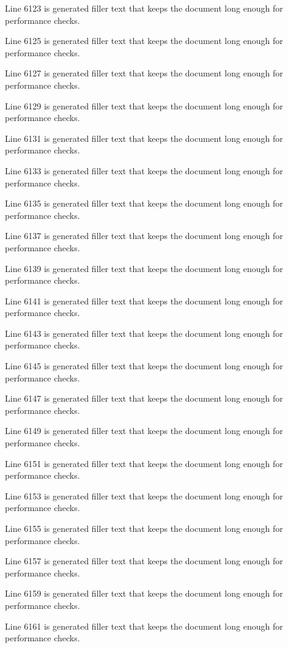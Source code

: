 Line 6123 is generated filler text that keeps the document long enough for performance checks.

Line 6125 is generated filler text that keeps the document long enough for performance checks.

Line 6127 is generated filler text that keeps the document long enough for performance checks.

Line 6129 is generated filler text that keeps the document long enough for performance checks.

Line 6131 is generated filler text that keeps the document long enough for performance checks.

Line 6133 is generated filler text that keeps the document long enough for performance checks.

Line 6135 is generated filler text that keeps the document long enough for performance checks.

Line 6137 is generated filler text that keeps the document long enough for performance checks.

Line 6139 is generated filler text that keeps the document long enough for performance checks.

Line 6141 is generated filler text that keeps the document long enough for performance checks.

Line 6143 is generated filler text that keeps the document long enough for performance checks.

Line 6145 is generated filler text that keeps the document long enough for performance checks.

Line 6147 is generated filler text that keeps the document long enough for performance checks.

Line 6149 is generated filler text that keeps the document long enough for performance checks.

Line 6151 is generated filler text that keeps the document long enough for performance checks.

Line 6153 is generated filler text that keeps the document long enough for performance checks.

Line 6155 is generated filler text that keeps the document long enough for performance checks.

Line 6157 is generated filler text that keeps the document long enough for performance checks.

Line 6159 is generated filler text that keeps the document long enough for performance checks.

Line 6161 is generated filler text that keeps the document long enough for performance checks.


